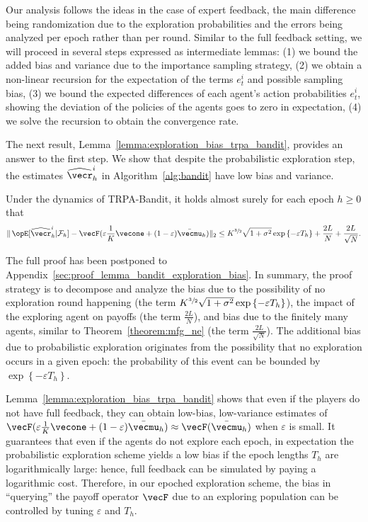 Our analysis follows the ideas in the case of expert feedback, the main difference being randomization due to the exploration probabilities and the errors being analyzed per epoch rather than per round.
Similar to the full feedback setting, we will proceed in several steps expressed as intermediate lemmas:
(1) we bound the added bias and variance due to the importance sampling strategy,
(2) we obtain a non-linear recursion for the expectation of the terms $e_t^i$ and possible sampling bias, 
(3) we bound the expected differences of each agent's action probabilities $e_t^i$, showing the deviation of the policies of the agents goes to zero in expectation, 
(4) we solve the recursion to obtain the convergence rate.

The next result, Lemma~\ref{lemma:exploration_bias_trpa_bandit}, provides an answer to the first step.
We show that despite the probabilistic exploration step, the estimates $\widehat{\vecr}_h^i$ in Algorithm~\ref{alg:bandit} have low bias and variance.

\begin{lemma}\label{lemma:exploration_bias_trpa_bandit}
Under the dynamics of TRPA-Bandit, it holds almost surely for each epoch $h \geq 0$ that
\begin{align*}
    \| \Exop[\widehat{\vecr}_h^i | 
 \mathcal{F}_h ] - \vecF(\varepsilon \frac{1}{K}\vecone + (1-\varepsilon) \bar{\vecmu}_h) \|_2 \leq K^{\sfrac{3}{2}} \sqrt{1 + \sigma^2} \exp\left\{ -\varepsilon T_{h}\right\} + \frac{2L}{N} + \frac{2L}{\sqrt{N}}.
\end{align*}
\end{lemma}

The full proof has been postponed to Appendix~\ref{sec:proof_lemma_bandit_exploration_bias}.
In summary, the proof strategy is to decompose and analyze the bias due to the possibility of no exploration round happening (the term $K^{\sfrac{3}{2}} \sqrt{1 + \sigma^2} \exp\left\{ -\varepsilon T_{h}\right\}$),  the impact of the exploring agent on payoffs (the term $\frac{2L}{N}$), and bias due to the finitely many agents, similar to Theorem~\ref{theorem:mfg_ne} (the term $\frac{2L}{\sqrt{N}}$).
The additional bias due to probabilistic exploration originates from the possibility that no exploration occurs in a given epoch: the probability of this event can be bounded by $\exp\left\{ -\varepsilon T_{h}\right\}$.

Lemma~\ref{lemma:exploration_bias_trpa_bandit} shows that even if the players do not have full feedback, they can obtain low-bias, low-variance estimates of $\vecF(\varepsilon \frac{1}{K}\vecone + (1-\varepsilon) \bar{\vecmu}_h) \approx \vecF(\bar{\vecmu}_h)$ when $\varepsilon$ is small.
It guarantees that even if the agents do not explore each epoch, in expectation the probabilistic exploration scheme yields a low bias if the epoch lengths $T_h$ are logarithmically large: hence, full feedback can be simulated by paying a logarithmic cost.
Therefore, in our epoched exploration scheme, the bias in ``querying'' the payoff operator $\vecF$ due to an exploring population can be controlled by tuning $\varepsilon$ and $T_h$.

